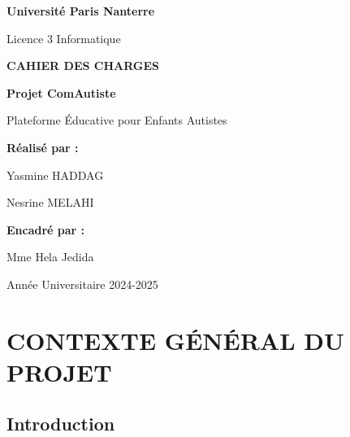 \documentclass[12pt,a4paper]{report}
\begin{document}
\begin{titlepage}
    \centering
    \vspace*{1cm}
    
    {\huge\bfseries Université Paris Nanterre\par}
    \vspace{0.5cm}
    {\Large Licence 3 Informatique\par}
    \vspace{2cm}
    
    {\Huge\bfseries CAHIER DES CHARGES\par}
    \vspace{1cm}
    {\LARGE\bfseries Projet ComAutiste\par}
    \vspace{0.5cm}
    {\Large Plateforme Éducative pour Enfants Autistes\par}
    
    \vspace{3cm}
    
    \begin{minipage}{0.8\textwidth}
        \centering
        {\Large\textbf{Réalisé par :}\par}
        \vspace{0.3cm}
        {\large Yasmine HADDAG\par}
        {\large Nesrine MELAHI\par}
    \end{minipage}
    
    \vspace{1.5cm}
    
    {\Large\textbf{Encadré par :}\par}
    \vspace{0.3cm}
    {\large Mme Hela Jedida\par}
    
    \vfill
    
    {\large Année Universitaire 2024-2025\par}
\end{titlepage}

\tableofcontents
\newpage

\chapter{CONTEXTE GÉNÉRAL DU PROJET}

\section{Introduction}
\end{document}
